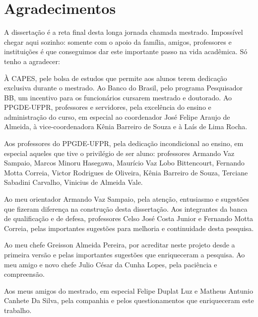 \documentclass[../thesis.tex]{subfiles}
\begin{document}
	
	\newpage
	
	\section*{\center Agradecimentos} %
	
	\begin{spacing}{1.1}
		
	A dissertação é a reta final desta longa jornada chamada mestrado. Impossível chegar aqui sozinho: somente com o apoio da família, amigos, professores e instituições é que conseguimos dar este importante passo na vida acadêmica. Só tenho a agradecer:
	
	À CAPES, pele bolsa de estudos que permite aos alunos terem dedicação exclusiva durante o mestrado. Ao Banco do Brasil, pelo programa Pesquisador BB, um incentivo para os funcionários cursarem mestrado e doutorado. Ao PPGDE-UFPR, professores e servidores, pela excelência do ensino e administração do curso, em especial ao coordenador José Felipe Araujo de Almeida, à vice-coordenadora Kênia Barreiro de Souza e à Laís de Lima Rocha.

	Aos professores do PPGDE-UFPR, pela dedicação incondicional ao ensino, em especial aqueles que tive o privilégio de ser aluno: professores Armando Vaz Sampaio, Marcos Minoru Hasegawa, Maurício Vaz Lobo Bittencourt, Fernando Motta Correia, Victor Rodrigues de Oliveira, Kênia Barreiro de Souza, Terciane Sabadini Carvalho, Vinicius de Almeida Vale. %
	
	Ao meu orientador Armando Vaz Sampaio, pela atenção, entusiasmo e sugestões que fizeram diferença na construção desta dissertação. Aos integrantes da banca de qualificação e de defesa, professores Celso José Costa Junior e Fernando Motta Correia, pelas importantes sugestões para melhoria e continuidade desta pesquisa.

	Ao meu chefe Greisson Almeida Pereira, por acreditar neste projeto desde a primeira versão e pelas importantes sugestões que enriqueceram a pesquisa. Ao meu amigo e novo chefe Julio César da Cunha Lopes, pela paciência e compreensão.
	
	Aos meus amigos do mestrado, em especial Felipe Duplat Luz e Matheus Antunio Canhete Da Silva, pela companhia e pelos questionamentos que enriqueceram este trabalho.
	

\end{spacing}
\end{document}
